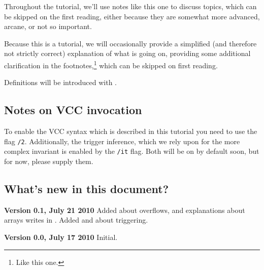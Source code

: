 \begin{note}
  Throughout the tutorial, we'll use notes like this one to discuss
  topics, which can be skipped on the first reading, either because
  they are somewhat more advanced, arcane, or not so important.
\end{note}

  Because this is a tutorial, we will occasionally provide a simplified (and
  therefore not strictly correct) explanation of what is going on, providing
  some additional clarification in the footnotes,\footnote{Like this one.}
  which can be skipped on first reading.

  Definitions will be introduced with .

\subsection{Notes on VCC invocation}
\label{sect:todo-invoke}

To enable the VCC syntax which is described in this tutorial you need
to use the flag \texttt{/2}.
Additionally, the trigger inference, which we rely upon for
the more complex invariant is enabled by the \texttt{/it}
flag.
Both will be on by default soon, but for now, please supply them.

\subsection{What's new in this document?}

\noindent \textbf{Version 0.1, July 21 2010}
Added  about overflows, and explanations about arrays writes in .
Added  and  about triggering.

\noindent \textbf{Version 0.0, July 17 2010}
Initial.

